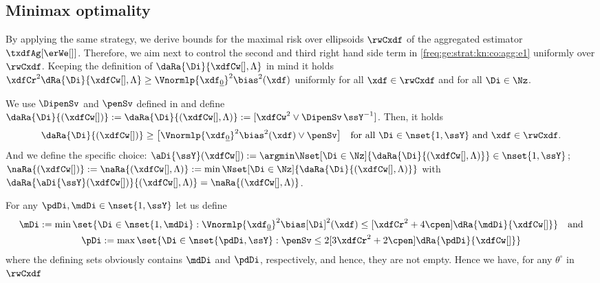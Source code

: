 \subsection{Minimax optimality}\label{FREQ_GAUSS_MINIMAX}
  By applying the same strategy, we derive bounds for the maximal risk over
  ellipsoids  $\rwCxdf$ of the aggregated estimator $\txdfAg[{\erWe[]}]$.
  Therefore, we aim next to control the second and
  third right hand side term in \eqref{freq:ge:strat:kn:co:agg:e1} uniformly over
  $\rwCxdf$.
  Keeping the definition  of
$\daRa{\Di}{\xdfCw[],\Lambda}$  in mind it holds
$\xdfCr^2\dRa{\Di}{\xdfCw[],\Lambda}\geq\Vnormlp{\xdf_{\underline{0}}}^2\bias^2(\xdf)$
uniformly for all $\xdf\in\rwCxdf$ and for all
$\Di\in\Nz$.
\begin{de}
We use $\DipenSv$ and $\penSv$ defined in  and define
  $\daRa{\Di}{(\xdfCw[])}:=\daRa{\Di}{(\xdfCw[],\Lambda)}:=[\xdfCw^2\vee \DipenSv\,\ssY^{-1}]$.
  Then, it holds
  \begin{equation*}
    [\xdfCr^2+\cpen]\daRa{\Di}{(\xdfCw[])}\geq\big[\Vnormlp{\xdf_{\underline{0}}}^2\bias^2(\xdf)\vee\penSv\big]\quad\text{for
      all $\Di\in\nset{1,\ssY}$ and $\xdf\in\rwCxdf$}.
\end{equation*}
And we define the specific choice:
    $\aDi{\ssY}(\xdfCw[]):=\argmin\Nset[\Di\in\Nz]{\daRa{\Di}{(\xdfCw[],\Lambda)}}\in\nset{1,\ssY}$;\\
    $\naRa{(\xdfCw[])}:=\naRa{(\xdfCw[],\Lambda)}:=\min\Nset[\Di\in\Nz]{\daRa{\Di}{(\xdfCw[],\Lambda)}}$
    with $\daRa{\aDi{\ssY}(\xdfCw[])}{(\xdfCw[],\Lambda)}=\naRa{(\xdfCw[],\Lambda)}$.
\assEnd
\end{de}
For any $\pdDi,\mdDi\in\nset{1,\ssY}$ let us define 
\begin{multline*}
\mDi:=\min\set{\Di\in\nset{1,\mdDi}: \Vnormlp{\xdf_{\underline{0}}}^2\bias[\Di]^2(\xdf)\leq
  [\xdfCr^2+4\cpen]\dRa{\mdDi}{\xdfCw[]}}\quad\text{and}\\\pDi:=\max\set{\Di\in\nset{\pdDi,\ssY}:
   \penSv \leq 2[3\xdfCr^2+ 2\cpen] \dRa{\pdDi}{\xdfCw[]}}
\end{multline*}
where  the defining sets obviously contains $\mdDi$ and $\pdDi$, respectively, and hence, they are
not empty.
Hence we have, for any $\theta^{\circ}$ in $\rwCxdf$
